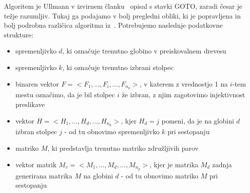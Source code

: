 \documentclass[a4paper, 12pt, ]{book}
\begin{document}
	Algoritem je Ullmann v izvirnem članku~\cite{ullmann} opisal s stavki GOTO, zaradi česar je težje razumljiv. Tukaj ga podajamo v bolj pregledni obliki,
	ki je popravljena in bolj podrobna različica algoritma iz~\cite{zampelli-th}. Potrebujemo naslednje podatkovne strukture:
	\begin{itemize}
		\item spremenljivko $d$, ki označuje trenutno globino v preiskovalnem drevesu
		\item spremenljivko $k$, ki označuje trenutno izbrani stolpec
		\item binaren vektor $F = <F_1, \ldots, F_i, \ldots,  F_{n_p} > $, v katerem z vrednostjo 1 na $i$-tem mestu označimo, 
			da je bil stolpec $i$ že izbran, z njim zagotovimo injektivnost preslikave
		\item vektor $H = < H_1, \ldots, H_d, \ldots, H_{n_p} > $, kjer $H_d = j$ pomeni, da je na globini $d$ izbran stolpec $j$ - od tu 
			obnovimo spremenljivko $k$ pri sestopanju
		\item matriko $M$, ki predstavlja trenutno matriko združljivih parov
		\item vektor matrik $M_v = < M_1, \ldots, M_d, \ldots, M_{n_p} > $, kjer je matrika $M_d$ zadnja generirana matrika $M$ na globini $d$ - od
			tu obnovimo matriko $M$ pri sestopanju
	\end{itemize}
\end{document}
